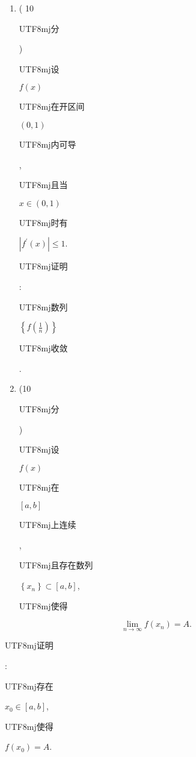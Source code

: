 \documentclass[10pt]{article}
\begin{document}
\begin{enumerate}
  \item ( 10 \begin{CJK}{UTF8}{mj}分\end{CJK}) \begin{CJK}{UTF8}{mj}设\end{CJK} $f(x)$ \begin{CJK}{UTF8}{mj}在开区间\end{CJK} $(0,1)$ \begin{CJK}{UTF8}{mj}内可导\end{CJK}, \begin{CJK}{UTF8}{mj}且当\end{CJK} $x \in(0,1)$ \begin{CJK}{UTF8}{mj}时有\end{CJK} $\left|f^{\prime}(x)\right| \leqslant 1$. \begin{CJK}{UTF8}{mj}证明\end{CJK}: \begin{CJK}{UTF8}{mj}数列\end{CJK} $\left\{f\left(\frac{1}{n}\right)\right\}$ \begin{CJK}{UTF8}{mj}收敛\end{CJK}.

  \item (10 \begin{CJK}{UTF8}{mj}分\end{CJK}) \begin{CJK}{UTF8}{mj}设\end{CJK} $f(x)$ \begin{CJK}{UTF8}{mj}在\end{CJK} $[a, b]$ \begin{CJK}{UTF8}{mj}上连续\end{CJK}, \begin{CJK}{UTF8}{mj}且存在数列\end{CJK} $\left\{x_{n}\right\} \subset[a, b]$, \begin{CJK}{UTF8}{mj}使得\end{CJK}

\end{enumerate}
$$
\lim _{n \rightarrow \infty} f\left(x_{n}\right)=A .
$$
\begin{CJK}{UTF8}{mj}证明\end{CJK}: \begin{CJK}{UTF8}{mj}存在\end{CJK} $x_{0} \in[a, b]$, \begin{CJK}{UTF8}{mj}使得\end{CJK} $f\left(x_{0}\right)=A$.
\end{document}
